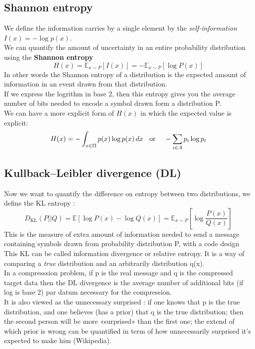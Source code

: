 \documentclass[a4paper,12pt]{report}
\newcommand{\bepar}[1]{
	\left( #1 \right)  
}
\newcommand{\becro}[1]{
	\left[ #1 \right]  
}
\newcommand\bk{\color{black}}
\newcommand\brick{\color{brick}}
\numberwithin{equation}{section} %
\begin{document}
\pagebreak
\brick \subsection{Shannon entropy} \bk
\noindent We define the information carries by a single element by the \textit{self-information} $I(x) = -\log p\bepar{x} $.\\
We can quantify the amount of uncertainty in an entire probability distribution using the \textbf{Shannon entropy} $$ H(x) = \mathbb{E}_{x\sim P}\becro{I(x)} = - \mathbb{E}_{x\sim P}\becro{\log P(x)} $$ In other words the Shannon entropy of a distribution is the expected amount of information in an event drawn from that distribution. \\
If we express the logrithm in base 2, then this entropy gives you the average number of bits needed to encode a symbol drawn form a distribution P.\\
We can have a more explicit form of $H(x)$ in which the expected value is explicit: $$ H(x) = - \int_{x\in\Omega} p(x) \log p(x)\, dx \text{\hspace{2mm} or \hspace{2mm} } -\sum_{i \in A} p_i \log p_i$$  
\brick \subsection{Kullback–Leibler divergence (DL)} \bk
Now we want to quantify the difference on entropy between two distributions, we define the KL entropy : $$D_{\text{KL}}\bepar{P||Q} = \mathbb{E} \becro{\log P(x) - \log Q(x)}=\mathbb{E}_{x\sim P}\becro{\log \frac{P(x)}{Q(x)}}$$ This is the measure of extra amount of information needed to send a message containing symbols drawn from probability distribution P, with a code design\\
This KL can be called information divergence or relative entropy. It is a way of comparing a \textit{true} distribution and an arbitrarily distribution q(x). \\
In a compresssion problem, if p is the real message and q is the compressed target data then the DL divergence is the average number of additional bits (if log is base 2) par datum necessary for the compression.\\
 It is also viewed as the unnecessary surprised : if one knows that p is the true distribution, and one believes (has a prior) that q is the true distribution; then the second person will be more «surprised» than the first one; the extend of which prior is wrong can be quantified in term of how unnecessarily surprised it's expected to make him (Wikipedia).\\
  
\end{document}

